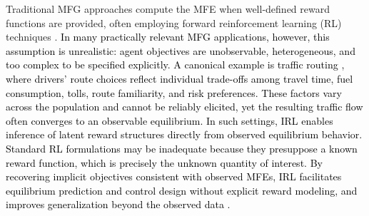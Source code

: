 \documentclass[11pt]{article}
\newcommand{\tb}[1]{\textcolor{black}{#1}} %
\begin{document}
Traditional MFG approaches compute the MFE when well-defined reward functions are provided, often employing forward reinforcement learning (RL) techniques \cite{LaPePeGiMuElGePi24}. \tb{
In many practically relevant MFG applications, however, this assumption is unrealistic: agent objectives are unobservable, heterogeneous, and too complex to be specified explicitly.
A canonical example is traffic routing \cite{9061051}, where drivers' route choices reflect individual trade-offs among travel time, fuel consumption, tolls, route familiarity, and risk preferences. These factors vary across the population and cannot be reliably elicited, yet the resulting traffic flow often converges to an observable equilibrium. 
In such settings, IRL enables inference of latent reward structures directly from observed equilibrium behavior. Standard RL formulations may be inadequate because they presuppose a known reward function, which is precisely the unknown quantity of interest. By recovering implicit objectives consistent with observed MFEs, IRL facilitates equilibrium prediction and control design without explicit reward modeling, and improves generalization beyond the observed data \cite{AdCoBe22}.
}


\end{document}
